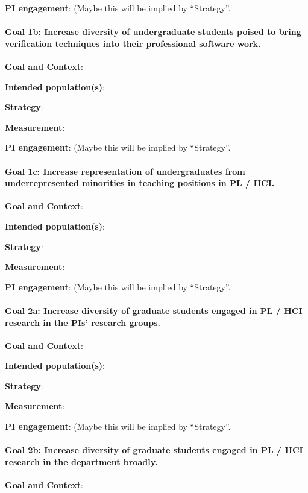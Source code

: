 \textbf{PI engagement}: (Maybe this will be implied by ``Strategy''.

\paragraph*{Goal 1b: Increase diversity of undergraduate students poised to
bring verification techniques into their professional software work.}

\textbf{Goal and Context}:

\textbf{Intended population(s)}:

\textbf{Strategy}:

\textbf{Measurement}:

\textbf{PI engagement}: (Maybe this will be implied by ``Strategy''.

\paragraph*{Goal 1c: Increase representation of undergraduates from
underrepresented minorities in teaching positions in PL / HCI.}

\textbf{Goal and Context}:

\textbf{Intended population(s)}:

\textbf{Strategy}:

\textbf{Measurement}:

\textbf{PI engagement}: (Maybe this will be implied by ``Strategy''.

\paragraph*{Goal 2a: Increase diversity of graduate students engaged in PL / HCI
research in the PIs' research groups.}

\textbf{Goal and Context}:

\textbf{Intended population(s)}:

\textbf{Strategy}:

\textbf{Measurement}:

\textbf{PI engagement}: (Maybe this will be implied by ``Strategy''.

\paragraph*{Goal 2b: Increase diversity of graduate students engaged in PL / HCI
research in the department broadly.}

\textbf{Goal and Context}:

